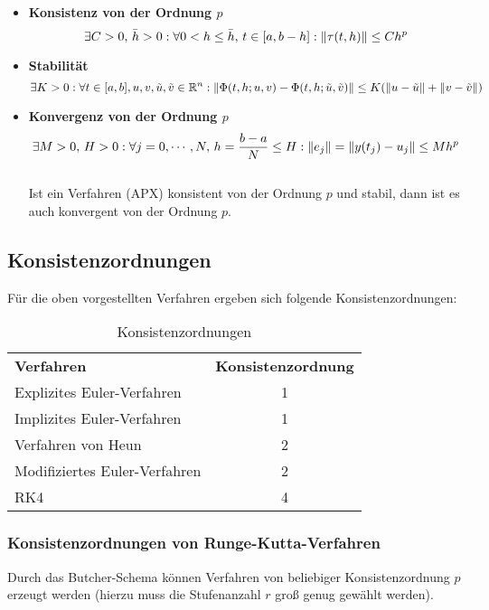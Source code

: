 		\begin{itemize}
			\item \textbf{Konsistenz von der Ordnung \(p\)}
				\begin{equation*}
					\exists C > 0,\, \bar{h} > 0 : \forall 0 < h \leq \bar{h},\, t \in [a, b - h] : \norm{\tau(t, h)} \leq C h^p
				\end{equation*}
			\item \textbf{Stabilität}
				\begin{equation*}
					\exists K > 0 : \forall t \in [a, b], u, v, \tilde{u}, \tilde{v} \in \mathbb{R}^n : \norm{\Phi(t, h; u, v) - \Phi(t, h; \tilde{u}, \tilde{v})} \leq K (\norm{u - \tilde{u}} + \norm{v - \tilde{v}})
				\end{equation*}
			\item \textbf{Konvergenz von der Ordnung \(p\)}
				\begin{equation*}
					\exists M > 0,\, H > 0 : \forall j = 0, \cdots, N,\, h = \frac{b-a}{N} \leq H : \norm{e_j} = \norm{y(t_j) - u_j} \leq M h^p
				\end{equation*} \\ Ist ein Verfahren (APX) konsistent von der Ordnung \(p\) und stabil, dann ist es auch konvergent von der Ordnung \(p\).
		\end{itemize}

		\subsection{Konsistenzordnungen}
			Für die oben vorgestellten Verfahren ergeben sich folgende Konsistenzordnungen:
			\begin{table}[H]
				\centering
				\begin{tabular}{l c}
					\textbf{Verfahren}            & \textbf{Konsistenzordnung} \\
					Explizites Euler-Verfahren    & 1                          \\
					Implizites Euler-Verfahren    & 1                          \\
					Verfahren von Heun            & 2                          \\
					Modifiziertes Euler-Verfahren & 2                          \\
					RK4                           & 4
				\end{tabular}
				\caption{Konsistenzordnungen}
				\label{tab:consistency}
			\end{table}

			\subsubsection{Konsistenzordnungen von Runge-Kutta-Verfahren}
				Durch das Butcher-Schema können Verfahren von beliebiger Konsistenzordnung \(p\) erzeugt werden (hierzu muss die Stufenanzahl \(r\) groß genug gewählt werden).

